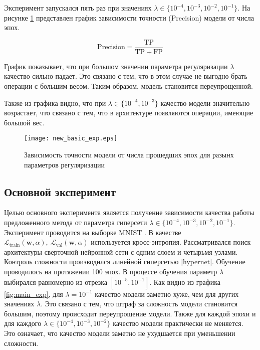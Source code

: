 \documentclass[12pt, twoside]{article}
\begin{document}
Эксперимент запускался пять раз при значениях $\lambda \in \{10^{-4}, 10^{-3}, 10^{-2}, 10^{-1}\}$. На рисунке \ref{fig:basic_exp} представлен график зависимости точности (Precision) модели от числа эпох.

\begin{equation}
\mathrm{Precision} = \frac{\mathrm{TP}}{\mathrm{TP} + \mathrm{FP}}
\end{equation}

График показывает, что при большом значении параметра регуляризации $\lambda$ качество сильно падает. Это связано с тем, что в этом случае не выгодно брать операции с большим весом. Таким образом, модель становится переупрощенной.

 Также из графика видно, что при $\lambda \in \{10^{-4}, 10^{-3}\}$ качество модели значительно возрастает, что связано с тем, что в архитектуре появляются операции, имеющие большой вес.

\begin{figure}[H]
\centering
  \texttt{[image: new\_basic\_exp.eps]}
  \caption{Зависимость точности модели от числа прошедших эпох для разынх параметров регуляризации}
  \label{fig:basic_exp}
\end{figure}

\subsection{Основной эксперимент}

Целью основного эксперимента является получение зависимости качества работы предложенного метода от параметра гиперсети $\lambda \in \{10^{-4}, 10^{-3}, 10^{-2}, 10^{-1}\}$. Эксперимент проводится на выборке MNIST \cite{lecun-mnisthandwrittendigit-2010}. В качестве $\mathcal{L}_\text{train}(\mathbf{w}, \alpha), ~\mathcal{L}_\text{val}(\mathbf{w}, \alpha)$ используется кросс-энтропия. Рассматривался поиск архитектуры сверточной нейронной сети с одним слоем и четырьмя узлами. Контроль сложности производился линейной гиперсетью \eqref{hypernet}. Обучение проводилось на протяжении 100 эпох. В процессе обучения параметр $\lambda$ выбирался равномерно из отрезка $[10^{-5}, 10^{-1}]$. Как видно из графика \ref{fig:main_exp}, для $\lambda = 10^{-1}$ качество модели заметно хуже, чем для других значениях $\lambda$. Это связано с тем, что штраф за сложность модели становится большим, поэтому происходит переупрощение модели. Также для каждой эпохи и для каждого $\lambda \in \{10^{-4}, 10^{-3}, 10^{-2}\}$ качество модели практически не меняется. Это означает, что качество модели заметно не ухудшается при уменьшении сложности.
\end{document}
